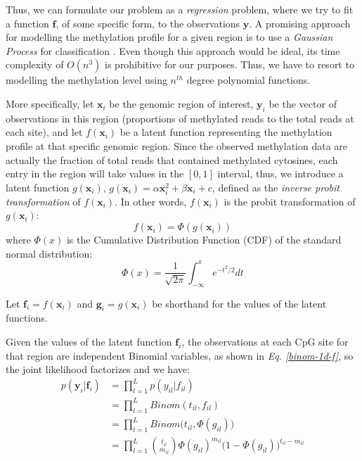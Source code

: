 Thus, we can formulate our problem as a \emph{regression} problem, where we try to fit a function $\mathbf{f}$, of some specific form, to the observations $\mathbf{y}$. A promising approach for modelling the methylation profile for a given region is to use a \emph{Gaussian Process} for classification \citep{Rasmussen2006}. Even though this approach would be ideal, its time complexity of $O(n^{3})$ is prohibitive for our purposes. Thus, we have to resort to modelling the methylation level using $n^{th}$ degree polynomial functions.

More specifically, let $\mathbf{x}_{i}$ be the genomic region of interest, $\mathbf{y}_{i}$ be the vector of observations in this region (\ie proportions of methylated reads to the total reads at each site), and let $f(\mathbf{x}_{i})$ be a latent function representing the methylation profile at that specific genomic region. Since the observed methylation data are actually the fraction of total reads that contained methylated cytosines, each entry in the region will take values in the $[0, 1]$ interval, thus, we introduce a latent function $g(\mathbf{x}_{i})$, \eg $g(\mathbf{x}_{i}) = \alpha \mathbf{x}_{i}^{2} + \beta \mathbf{x}_{i} + c$, defined as the \emph{inverse probit transformation} of $f(\mathbf{x}_{i})$. In other words, $f(\mathbf{x}_{i})$ is the probit transformation of $g(\mathbf{x}_{i})$:
\begin{equation} \label{probit-transform-f}
	f(\mathbf{x}_{i}) = \Phi(g(\mathbf{x}_{i}))
\end{equation}
where $\Phi(x)$ is the Cumulative Distribution Function (CDF) of the standard normal distribution:
\begin{equation} \label{cdf-stand-normal-f}
	\Phi(x) = \frac{1}{\sqrt{2\pi}} \int_{-\infty}^{x} e^{-t^{2}/2}dt
\end{equation}

Let $\mathbf{f}_{i} = f(\mathbf{x}_{i})$ and $\mathbf{g}_{i} = g(\mathbf{x}_{i})$ be shorthand for the values of the latent functions.

Given the values of the latent function $\mathbf{f}_{i}$, the observations at each CpG site for that region are independent Binomial variables, as shown in \emph{Eq. \ref{binom-1d-f}}, so the joint likelihood factorizes and we have:
\begin{equation} \label{likel-binom-prob-f}
  \begin{split}
	p(\mathbf{y}_{i}|\mathbf{f}_{i}) & = \prod_{l=1}^{L} p(y_{il}|f_{il}) \\
							 & = \prod_{l=1}^{L} Binom(t_{il}, f_{il}) \\
							 & = \prod_{l=1}^{L} Binom\big(t_{il}, \Phi(g_{il})\big) \\
							 & = \prod_{l=1}^{L} \binom{t_{il}}{m_{il}} \Phi(g_{il})^{m_{il}} (1 - \Phi(g_{il})\big)^{t_{il} - m_{il}}
  \end{split}
\end{equation}

